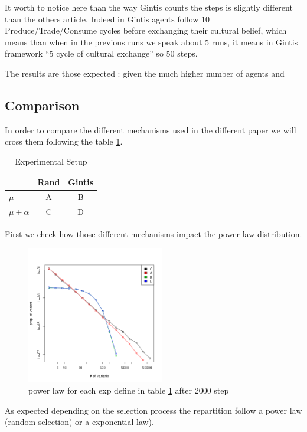 \documentclass[a4paper]{article}
\begin{document}
It worth to notice here than the way Gintis counts the steps is slightly different than the others article. Indeed in Gintis agents follow 10 Produce/Trade/Consume cycles before exchanging their cultural belief, which means than when in the previous runs we speak about 5 runs, it means in Gintis framework ``5 cycle of cultural exchange'' so 50 steps.

The results are those expected : given the much higher number of agents and 


\subsection{Comparison}
In order to compare the different mechanisms used in the different paper we will cross them  following the table \ref{tab:exp}.
\begin{table}
	\centering
	\begin{tabular}{l|c|c}
		& Rand & Gintis \\\hline
		$\mu$ &A & B \\
		$\mu +\alpha$ & C & D \\
	\end{tabular}
	\caption{Experimental Setup}
	\label{tab:exp}
\end{table}


First we check how those different mechanisms impact the power law distribution.

\begin{figure}[hbp]
	\begin{center}
		\includegraphics[width=6cm]{img/powerABCD.png}
	\end{center}
	\caption{power law for each exp define in table \ref{tab:exp} after 2000 step}
	\label{fig:powerABCD}
\end{figure}

As expected depending on the selection process the repartition follow a power law (random selection) or a exponential law).
\end{document}
